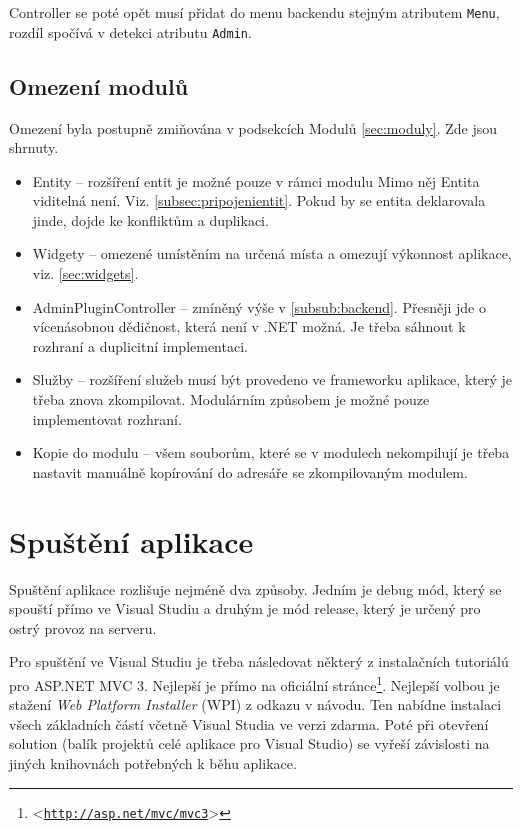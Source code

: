 \documentclass[11pt,twoside,a4paper]{book}
\let\oldUrl\url
\renewcommand\url[1]{<\texttt{\oldUrl{#1}}>}
\begin{document}
Controller se poté opět musí přidat do menu backendu stejným atributem \texttt{Menu}, rozdíl spočívá v detekci atributu \texttt{Admin}. 

\subsection{Omezení modulů}

Omezení byla postupně zmiňována v podsekcích Modulů \ref{sec:moduly}. Zde jsou shrnuty.

\begin{itemize}
\item Entity -- rozšíření entit je možné pouze v rámci modulu Mimo něj Entita viditelná není. Viz. \ref{subsec:pripojenientit}. Pokud by se entita deklarovala jinde, dojde ke konfliktům a duplikaci.
\item Widgety -- omezené umístěním na určená místa a omezují výkonnost aplikace, viz. \ref{sec:widgets}.
\item AdminPluginController -- zmíněný výše v \ref{subsub:backend}. Přesněji jde o vícenásobnou dědičnost, která není v .NET možná. Je třeba sáhnout k rozhraní a duplicitní implementaci.
\item Služby -- rozšíření služeb musí být provedeno ve frameworku aplikace, který je třeba znova zkompilovat. Modulárním způsobem je možné pouze implementovat rozhraní.
\item Kopie do modulu -- všem souborům, které se v modulech nekompilují je třeba nastavit manuálně kopírování do adresáře se zkompilovaným modulem.
\end{itemize}



\section{Spuštění aplikace}

Spuštění aplikace rozlišuje nejméně dva způsoby. Jedním je debug mód, který se spouští přímo ve Visual Studiu a druhým je mód release, který je určený pro ostrý provoz na serveru.

Pro spuštění ve Visual Studiu je třeba následovat některý z instalačních tutoriálú pro ASP.NET MVC 3. Nejlepší je přímo na oficiální stránce\footnote{\url{http://asp.net/mvc/mvc3}}. Nejlepší volbou je stažení \textit{Web Platform Installer} (WPI) z odkazu v návodu. Ten nabídne instalaci všech základních částí včetně Visual Studia ve verzi zdarma. Poté při otevření \textsf{solution} (balík projektů celé aplikace pro Visual Studio) se vyřeší závislosti na jiných knihovnách potřebných k běhu aplikace.
\end{document}

